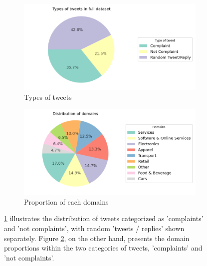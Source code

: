 \begin{figure}[htbp]
    \centering
    \captionsetup{font=small}
    \begin{subfigure}{0.49\textwidth}
        \centering
        \includegraphics[width=\linewidth]{figures/compl_non_random_dist.png}
        \caption{Types of tweets}
        \label{fig: compl_non_random_dist}
    \end{subfigure}
    \hfill
    \begin{subfigure}{0.49\textwidth}
        \centering
        \includegraphics[width=\linewidth]{figures/domain_dist.png}
        \caption{Proportion of each domains}
        \label{fig: domain_dist}
    \end{subfigure}
    \caption{ \ref{fig: compl_non_random_dist} illustrates the distribution of tweets categorized as 'complaints' and 'not complaints', with random 'tweets / replies' shown separately. Figure \ref{fig: domain_dist}, on the other hand, presents the domain proportions within the two categories of tweets, 'complaints' and 'not complaints'.}
    \label{fig: compl_main_dist}
\end{figure}

